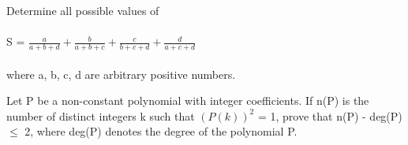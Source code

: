 


\item Determine all possible values of\\
\\ S = $\frac{a}{a+b+d} + \frac{b}{a+b+c} + \frac{c}{b+c+d} + \frac{d}{a+c+d}$\\
\\where a, b, c, d are arbitrary positive numbers.\\

\item Let P be a non-constant polynomial with integer coefficients. If n(P) is the number of distinct integers k such that $(P(k))^2$ = 1, prove that n(P) - deg(P) $\leq$ 2, where deg(P) denotes the degree of the polynomial P.


